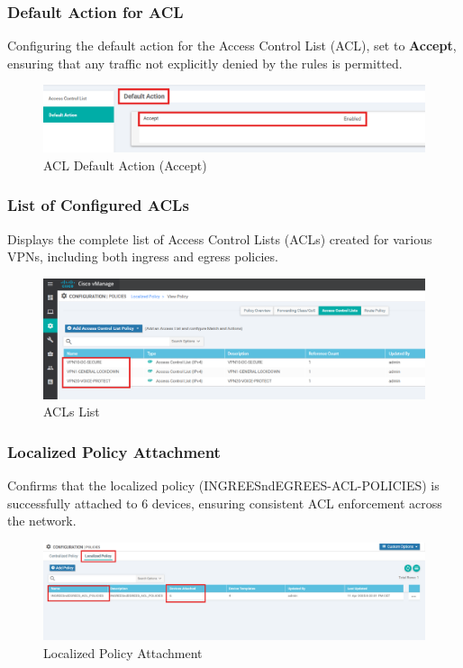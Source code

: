 \documentclass[12pt,english]{report}
\begin{document}
\subsubsection{Default Action for ACL}
Configuring the default action for the Access Control List (ACL), set to \textbf{Accept}, ensuring that any traffic not explicitly denied by the rules is permitted.
\begin{figure}[H]
    \centering
    \includegraphics[width=1\textwidth]{chapitre 3/def-act.png}
    \caption{ACL Default Action (Accept)}
    \label{ACL Default Action (Accept)}
\end{figure}
\subsubsection{List of Configured ACLs}
Displays the complete list of Access Control Lists (ACLs) created for various VPNs, including both ingress and egress policies.

\begin{figure}[H]
    \centering
    \includegraphics[width= 1 \textwidth]{chapitre 3/acl-listtt.png}
    \caption{ACLs List}
    \label{ACLs List}
\end{figure}
\subsubsection{Localized Policy Attachment}
Confirms that the localized policy (INGREESndEGREES-ACL-POLICIES) is successfully attached to 6 devices, ensuring consistent ACL enforcement across the network.
\begin{figure}[H]
    \centering
    \includegraphics[width= 1 \textwidth]{chapitre 3/template/locpol.png}
    \caption{Localized Policy Attachment}
    \label{Localized Policy Attachment}
\end{figure}
\end{document}
